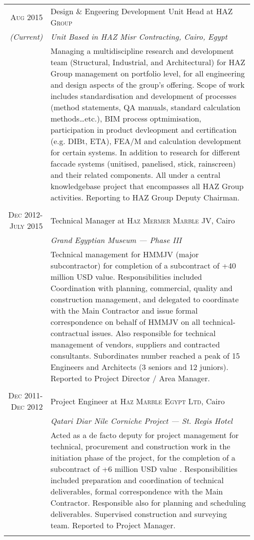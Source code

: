 \documentclass[a4paper,11pt]{article} %
\begin{document}
\begin{tabular}{r|p{11cm}}

\textsc{Aug 2015} & Design \& Engeering Development Unit Head at \textsc{HAZ Group}\\
\emph{(Current)} & \emph{Unit Based in HAZ Misr Contracting, Cairo, Egypt} \\
& \footnotesize{Managing a multidiscipline research and development team (Structural, Industrial, and Architectural) for HAZ Group management on portfolio level, for all engineering and design aspects of the group's offering. Scope of work includes standardisation and development of processes (method statements, QA manuals, standard calculation methods\ldots etc.), BIM process optmimisation, participation in product devleopment and certification (e.g. DIBt, ETA), FEA/M and calculation development for certain systems. In addition to research for different fac{c}ade systems (unitised, panelised, stick, rainscreen) and their related components. All under a central knowledgebase project that encompasses all HAZ Group activities. Reporting to HAZ Group Deputy Chairman.}\\
\multicolumn{2}{c}{} \\



\textsc{Dec 2012-July 2015} & Technical Manager at \textsc{Haz Mermer Marble JV}, Cairo\\
& \emph{Grand Egyptian Museum --- Phase III}\\ 
& \footnotesize{Technical management for HMMJV (major subcontractor) for completion of a subcontract of +40 million USD value. Responsibilities included Coordination with planning, commercial, quality and construction management, and delegated to coordinate with the Main Contractor and issue formal correspondence on behalf of HMMJV on all technical-contractual issues. Also responsible for technical management of vendors, suppliers and contracted consultants. Subordinates number reached a peak of 15 Engineers and Architects (3 seniors and 12 juniors). Reported to Project Director / Area Manager.}\\
\multicolumn{2}{c}{} \\


\textsc{Dec 2011-Dec 2012} & Project Engineer at \textsc{Haz Marble Egypt Ltd}, Cairo \\
& \emph{Qatari Diar Nile Corniche Project --- St. Regis Hotel} \\
& \footnotesize{Acted as a de facto deputy for project management for technical, procurement and construction work in the initiation phase of the project, for the completion of a subcontract of +6 million USD value . Responsibilities included preparation and coordination of technical deliverables, formal correspondence with the Main Contractor. Responsible also for planning and scheduling deliverables. Supervised construction and surveying team. Reported to Project Manager.}\\
\multicolumn{2}{c}{} \\


\end{tabular}
\end{document}
